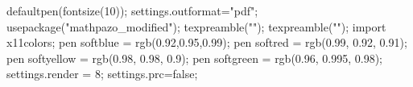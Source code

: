 
\begin{asydef} 
defaultpen(fontsize(10));
settings.outformat="pdf";
usepackage("mathpazo_modified");
texpreamble("\renewcommand{\vec}[1]{\mathbf{#1}}");
texpreamble("\providecommand{\e}{\mathrm{e}}"); 
import x11colors;
pen softblue = rgb(0.92,0.95,0.99);
pen softred = rgb(0.99, 0.92, 0.91);
pen softyellow = rgb(0.98, 0.98, 0.9);
pen softgreen = rgb(0.96, 0.995, 0.98);
settings.render = 8;
settings.prc=false; 
\end{asydef}

\newsavebox{\asybox}
\def\asydir{asy}

\makeatletter                       
\def\printauthor{%
  {\large \@author}}              
\makeatother

\author{\Large \textit{Samuel S.\ Watson}}

\newcommand{\milink}[3][-7.5mm]{\sidenote{\href{http://mathinsight.org/#2}{\mi} on #3}[#1]}
\newcommand\cocalc[1][-2pt]{\raisebox{#1}{\texttt{[image: figures/cocalc\_new]}}}
\newcommand\tbob[1][-2pt]{\raisebox{#1}{\texttt{[image: figures/3b1b\_new]}}}
\newcommand\mi[1][-2pt]{\raisebox{#1}{\texttt{[image: figures/mathinsight]}}}



\usetikzlibrary{decorations.fractals}

